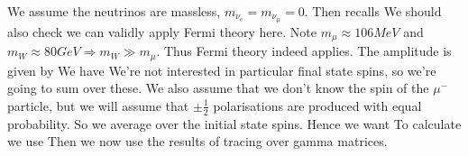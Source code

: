 \documentclass{article}
\begin{document}
We assume the neutrinos are massless, $m_{\nu_e} = m_{\nu_\mu} = 0$. Then recalls 
We should also check we can validly apply Fermi theory here. Note $m_\mu\approx 106 MeV$ and $m_W \approx 80 GeV \Rightarrow m_W \gg m_\mu$. Thus Fermi theory indeed applies. The amplitude is given by 
We have 
We're not interested in particular final state spins, so we're going to sum over these. We also assume that we don't know the spin of the $\mu^-$ particle, but we will assume that $\pm \frac{1}{2}$ polarisations are produced with equal probability. So we average over the initial state spins. Hence we want 
To calculate we use 
Then 
we now use the results of tracing over gamma matrices. 
\end{document}
